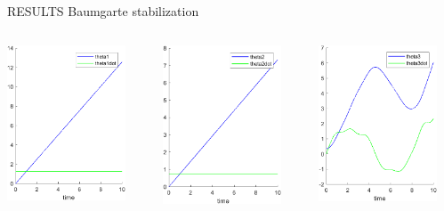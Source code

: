 \documentclass{beamer}              %
\begin{document}
	\begin{frame}{RESULTS Baumgarte stabilization}
		\begin{columns}
			\begin{column}{0.33\textwidth}
				\includegraphics[width=100pt]{grafici/matlabBaung1.png}
			\end{column}
			\begin{column}{0.33\textwidth}
				\includegraphics[width=100pt]{grafici/matlabBaung2.png}
			\end{column}
			\begin{column}{0.33\textwidth}
				\includegraphics[width=100pt]{grafici/matlabBaung3.png}
			\end{column}
		\end{columns}
	\end{frame}
\end{document}
